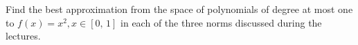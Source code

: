 \begin{problem}
Find the best approximation from the space of polynomials of degree at most one to $f(x) = x^2, x \in [0,\, 1]$ in each of the three norms discussed during the lectures.
\end{problem}

\begin{solution}

\end{solution}

 	

